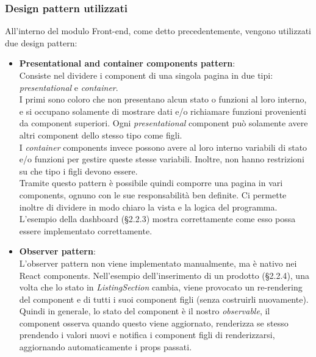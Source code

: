 \subsubsection{Design pattern utilizzati}
All'interno del modulo Front-end, come detto precedentemente, vengono utilizzati due design pattern:
\begin{itemize}
	\item \textbf{Presentational and container components pattern}:\\ 
	Consiste nel dividere i component di una singola pagina in due tipi: \textit{presentational} e \textit{container}.\\
	 I primi sono coloro che non presentano alcun stato o funzioni al loro interno, e si occupano solamente di mostrare dati e/o richiamare funzioni provenienti da component superiori. Ogni \textit{presentational} component può solamente avere altri component dello stesso tipo come figli. \\
	 I \textit{container} components invece possono avere al loro interno variabili di stato e/o funzioni per gestire queste stesse variabili. Inoltre, non hanno restrizioni su che tipo i figli devono essere.\\
	 Tramite questo pattern è possibile quindi comporre una pagina in vari components, ognuno con le sue responsabilità ben definite. Ci permette inoltre di dividere in modo chiaro la vista e la logica del programma.\\
	 L'esempio della dashboard (\S{2.2.3}) mostra correttamente come esso possa essere implementato correttamente.
	\item \textbf{Observer pattern}: \\L'observer pattern non viene implementato manualmente, ma è nativo nei React components. Nell'esempio dell'inserimento di un prodotto (\S{2.2.4}), una volta che lo stato in \textit{ListingSection} cambia, viene provocato un re-rendering del component e di tutti i suoi component figli (senza costruirli nuovamente).\\ Quindi in generale, lo stato del component è il nostro \textit{observable}, il component osserva quando questo viene aggiornato, renderizza se stesso prendendo i valori nuovi e notifica i component figli di renderizzarsi, aggiornando automaticamente i props passati.
\end{itemize} 
